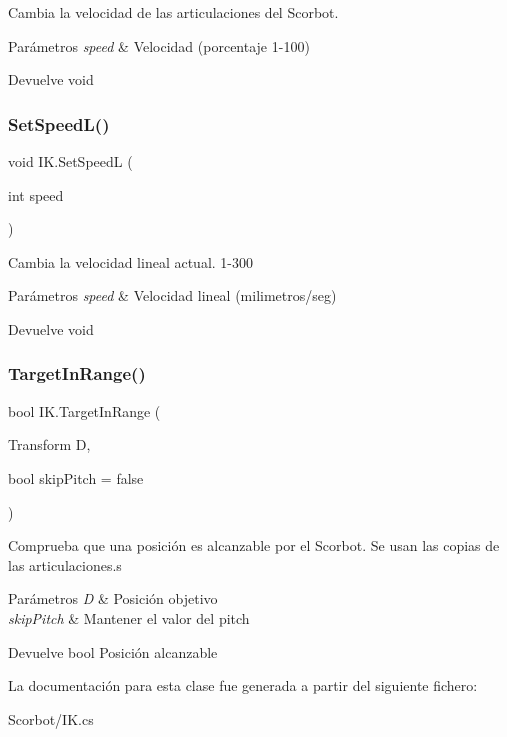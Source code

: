Cambia la velocidad de las articulaciones del Scorbot. 
\begin{DoxyParams}{Parámetros}
{\em speed} & Velocidad (porcentaje 1-\/100) \\
\hline
\end{DoxyParams}
\begin{DoxyReturn}{Devuelve}
void 
\end{DoxyReturn}
\mbox{\label{class_i_k_afc1472fadfc08f9df7374af09ca83110}} 
\subsubsection{\texorpdfstring{SetSpeedL()}{SetSpeedL()}}
{\footnotesize\ttfamily void I\+K.\+Set\+SpeedL (\begin{DoxyParamCaption}\item[{int}]{speed }\end{DoxyParamCaption})\hspace{0.3cm}{\ttfamily [inline]}}

Cambia la velocidad lineal actual. 1-\/300 
\begin{DoxyParams}{Parámetros}
{\em speed} & Velocidad lineal (milimetros/seg) \\
\hline
\end{DoxyParams}
\begin{DoxyReturn}{Devuelve}
void 
\end{DoxyReturn}
\mbox{\label{class_i_k_ad97122f89dfb2c5bff5605cbcf5c5cc7}} 
\subsubsection{\texorpdfstring{TargetInRange()}{TargetInRange()}}
{\footnotesize\ttfamily bool I\+K.\+Target\+In\+Range (\begin{DoxyParamCaption}\item[{Transform}]{D,  }\item[{bool}]{skip\+Pitch = {\ttfamily false} }\end{DoxyParamCaption})\hspace{0.3cm}{\ttfamily [inline]}}

Comprueba que una posición es alcanzable por el Scorbot. Se usan las copias de las articulaciones.\+s 
\begin{DoxyParams}{Parámetros}
{\em D} & Posición objetivo \\
\hline
{\em skip\+Pitch} & Mantener el valor del pitch \\
\hline
\end{DoxyParams}
\begin{DoxyReturn}{Devuelve}
bool Posición alcanzable 
\end{DoxyReturn}


La documentación para esta clase fue generada a partir del siguiente fichero\+:\begin{DoxyCompactItemize}
\item 
Scorbot/I\+K.\+cs\end{DoxyCompactItemize}
